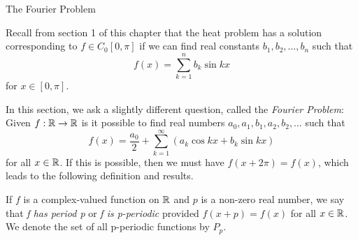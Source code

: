 \begin{section}{The Fourier Problem}

Recall from section 1 of this chapter that
the heat problem has a solution corresponding
to $f \in C_0[0,\pi]$ if we can
find real constants $b_1, b_2, \ldots, b_n$
such that
	\begin{displaymath}
		f(x) = \sum_{k=1}^n b_k \sin kx
	\end{displaymath}
for $x \in [0,\pi]$.


In this section, we ask a slightly different
question, called the \emph{Fourier Problem}:
Given $f:\mathbb{R} \to \mathbb{R}$ is it possible to
find real numbers $a_0, a_1, b_1, a_2, b_2,
\ldots$ such that
	\begin{displaymath}
		f(x) = \frac{a_0}{2} + \sum_{k=1}^\infty
			(a_k \cos kx + b_k \sin kx)
	\end{displaymath}
for all $x \in \mathbb{R}$. If this is possible,
then we must have $f(x + 2\pi) = f(x)$, which
leads to the following definition and results.


\begin{defn}
	If $f$ is a complex-valued function on $\mathbb{R}$
	and $p$ is a non-zero real number, we say that
	\emph{f has period p} or \emph{f is p-periodic}
	provided $f(x+p) = f(x)$ for all $x \in \mathbb{R}$.
	We denote the set of all p-periodic functions by
	$P_p$.
\end{defn}


\end{section}
